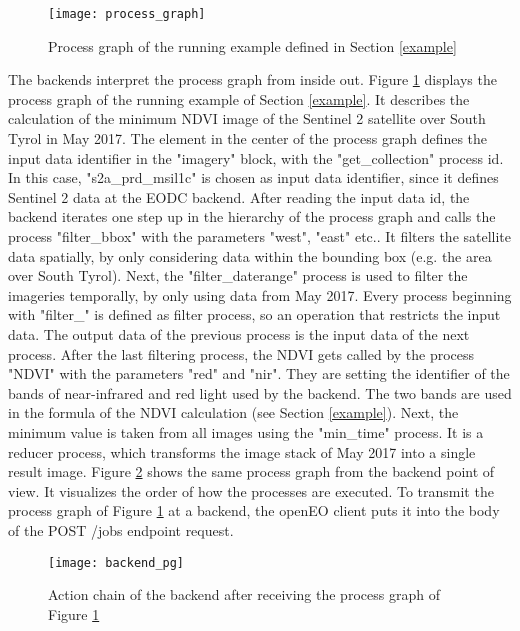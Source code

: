 \documentclass[draft,final]{vutinfth} %
\begin{document}
\begin{figure}[h]
	\centering
	\texttt{[image: process\_graph]}
	\caption{Process graph of the running example defined in Section \ref{example}}
	\label{fig:process_graph} %
\end{figure}


The backends interpret the process graph from inside out. Figure \ref{fig:process_graph} displays the process graph of the running example of Section \ref{example}. It describes the calculation of the minimum NDVI image of the Sentinel 2 satellite over South Tyrol in May 2017. The element in the center of the process graph defines the input data identifier in the "imagery" block, with the "get\_collection" process id. In this case, "s2a\_prd\_msil1c" is chosen as input data identifier, since it defines Sentinel 2 data at the EODC backend.
After reading the input data id, the backend iterates one step up in the hierarchy of the process graph and calls the process "filter\_bbox" with the parameters "west", "east" etc.. It filters the satellite data spatially, by only considering data within the bounding box (e.g. the area over South Tyrol). Next, the "filter\_daterange" process is used to filter the imageries temporally, by only using data from May 2017. Every process beginning with "filter\_" is defined as filter process, so an operation that restricts the input data. The output data of the previous process is the input data of the next process. After the last filtering process, the NDVI gets called by the process "NDVI" with the parameters "red" and "nir". They are setting the identifier of the bands of near-infrared and red light used by the backend. The two bands are used in the formula of the NDVI calculation (see Section \ref{example}). Next, the minimum value is taken from all images using the "min\_time" process. It is a reducer process, which transforms the image stack of May 2017 into a single result image. Figure \ref{fig:process_graph_diagram} shows the same process graph from the backend point of view. It visualizes the order of how the processes are executed. To transmit the process graph of Figure \ref{fig:process_graph} at a backend, the openEO client puts it into the body of the POST /jobs endpoint request.

\begin{figure}[h]
	\centering
	\texttt{[image: backend\_pg]}
	\caption{Action chain of the backend after receiving the process graph of Figure \ref{fig:process_graph}}
	\label{fig:process_graph_diagram} %
\end{figure}
\end{document}
